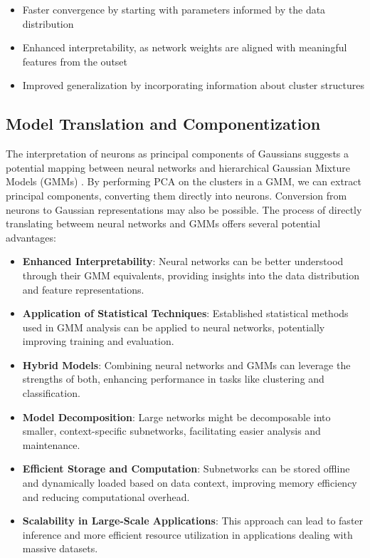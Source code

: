\begin{itemize} \item Faster convergence by starting with parameters informed by the data distribution \item Enhanced interpretability, as network weights are aligned with meaningful features from the outset \item Improved generalization by incorporating information about cluster structures \end{itemize}

\subsection{Model Translation and Componentization}

The interpretation of neurons as principal components of Gaussians suggests a potential mapping between neural networks and hierarchical Gaussian Mixture Models (GMMs) \citep{jacobs1991adaptive}. By performing PCA on the clusters in a GMM, we can extract principal components, converting them directly into neurons. Conversion from neurons to Gaussian representations may also be possible. The process of directly translating betweem neural networks and GMMs offers several potential advantages:

\begin{itemize}
    \item \textbf{Enhanced Interpretability}: Neural networks can be better understood through their GMM equivalents, providing insights into the data distribution and feature representations.
    \item \textbf{Application of Statistical Techniques}: Established statistical methods used in GMM analysis can be applied to neural networks, potentially improving training and evaluation.
    \item \textbf{Hybrid Models}: Combining neural networks and GMMs can leverage the strengths of both, enhancing performance in tasks like clustering and classification.
    \item \textbf{Model Decomposition}: Large networks might be decomposable into smaller, context-specific subnetworks, facilitating easier analysis and maintenance.
    \item \textbf{Efficient Storage and Computation}: Subnetworks can be stored offline and dynamically loaded based on data context, improving memory efficiency and reducing computational overhead.
    \item \textbf{Scalability in Large-Scale Applications}: This approach can lead to faster inference and more efficient resource utilization in applications dealing with massive datasets.
\end{itemize}

